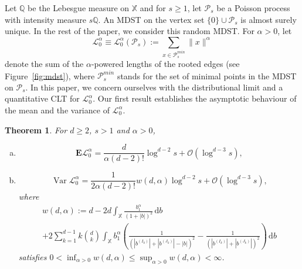 \documentclass[11pt,reqno]{amsart}
\numberwithin{equation}{section}
\newtheorem{theorem}{Theorem}[section]
\theoremstyle{definition}
\newcommand{\E}{\mathbf{E}}
\newcommand{\sP}{\mathcal{P}}
\newcommand{\XX}{\mathbb{X}}
\newcommand{\QQ}{\mathbb{Q}}
\newcommand{\diff}{{\,\mathrm d}}
\DeclareMathOperator{\Var}{Var}
\begin{document}
Let $\QQ$ be the Lebesgue measure on $\XX$ and for $s \ge 1$, let $\sP_s$ be a Poisson process with intensity measure $s \QQ$. An MDST on the vertex set $\{0\} \cup \sP_s$ is almost surely unique. In the rest of the paper, we consider this random MDST. For $\alpha>0$, let
\begin{equation}
\label{eq:ParetoPoints}
\mathscr{L}_0^{\alpha}\equiv \mathscr{L}_0^{\alpha}(\sP_s):=\sum_{x \in \sP_s^{min}} \|x\|^\alpha
\end{equation}
denote the sum of the $\alpha$-powered lengths of the rooted edges (see Figure~\ref{fig:mdst}), where $\sP_s^{min}$ stands for the set of minimal points in the MDST on $\sP_s$. In this paper, we concern ourselves with the distributional limit and a quantitative CLT for $\mathscr{L}_0^{\alpha}$. Our first result establishes the asymptotic behaviour of the mean and the variance of $\mathscr{L}_0^{\alpha}$. 

\begin{theorem}\label{thm:MV} For $d \ge 2$, $s > 1$ and $\alpha>0$,
	\begin{enumerate}[(a)]
		\item
	\begin{equation*}
		\E \mathscr{L}_0^{\alpha} = \frac{d}{\alpha (d-2)!} \log^{d-2} s + \mathcal{O}(\log^{d-3} s),
	\end{equation*}
\item 
\begin{equation*}
\Var{\mathscr{L}_0^{\alpha}} = \frac{1}{2\alpha(d-2)!} w(d,\alpha) \log^{d-2} s + \mathcal{O}(\log^{d-3} s),
\end{equation*}
where
\begin{multline}\label{eq:w}
w(d,\alpha):= d-2d \int_{\XX } \frac{b_1^\alpha }{(1+|b|)^{2}} \diff b \\
+ 2\sum_{k =1}^{d-1} k \binom{d}{k}\int_{\XX } b_1^{\alpha} \left(\frac{1}{(|b^{(I_k)}| + |b^{(J_k)}|-|b|)^{2}}  - \frac{1}{(|b^{(I_k)}| + |b^{(J_k)}|)^{2}}\right)\diff b
\end{multline}
satisfies $0<\inf_{\alpha>0} w(d,\alpha)\le \sup_{\alpha>0} w(d,\alpha)<\infty$.
\end{enumerate}
\end{theorem}
\end{document}
